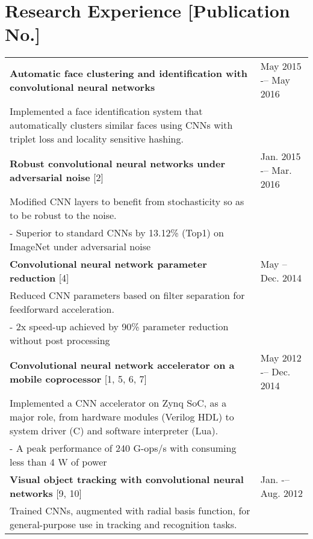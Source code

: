 \documentclass[11pt]{article}
\begin{document}
\section*{Research Experience {\tiny [Publication No.]}}
\begin{tabular}{L{0.73\textwidth} R{0.22\textwidth}}
  {\bf Automatic face clustering and identification with convolutional neural networks} & May 2015 -– May 2016 \\ [0pt]
  Implemented a face identification system that automatically clusters similar faces using CNNs with triplet loss and locality sensitive hashing. \\ [20pt]

  {\bf Robust convolutional neural networks under adversarial noise} {\tiny[2]} & Jan. 2015 -– Mar. 2016 \\ [0pt]
  Modified CNN layers to benefit from stochasticity so as to be robust to the noise. \\
  - Superior to standard CNNs by 13.12\% (Top1) on ImageNet under adversarial noise \\ [7pt]

  {\bf Convolutional neural network parameter reduction} {\tiny[4]} & May -- Dec. 2014 \\ [0pt]
  Reduced CNN parameters based on filter separation for feedforward acceleration. \\
  - 2x speed-up achieved by 90\% parameter reduction without post processing \\ [7pt]

  {\bf Convolutional neural network accelerator on a mobile coprocessor} {\tiny[1, 5, 6, 7]} & May 2012 -– Dec. 2014 \\ [0pt]
  Implemented a CNN accelerator on Zynq SoC, as a major role, from hardware modules (Verilog HDL) to system driver (C) and software interpreter (Lua). \\
  - A peak performance of 240 G-ops/s with consuming less than 4 W of power \\ [7pt]

  {\bf Visual object tracking with convolutional neural networks} {\tiny[9, 10]} & Jan. -– Aug. 2012 \\ [0pt]
  Trained CNNs, augmented with radial basis function, for general-purpose use in tracking and recognition tasks. \\ [7pt]



\end{tabular}
\end{document}
